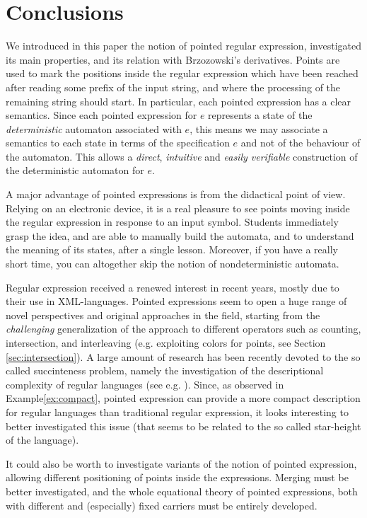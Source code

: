 \documentclass[preprint]{sigplanconf}
\begin{document}
\section{Conclusions}
We introduced in this paper the notion of pointed regular
expression, investigated its main properties, and its 
relation with Brzozowski's derivatives. 
Points are used to mark the positions inside the regular
expression which have been reached after reading some prefix of
the input string, and where the processing
of the remaining string should start. In particular,
each pointed expression has a clear semantics. Since
each pointed expression for $e$ represents a state of 
the {\em deterministic} automaton associated
with $e$, this means we may associate a semantics to each
state in terms of the specification $e$ 
and not of the behaviour of the automaton. 
This allows a {\em direct}, {\em intuitive} and 
{\em easily verifiable} construction of the deterministic 
automaton for $e$. 

A major advantage of pointed expressions 
is from the didactical point of view. Relying on 
an electronic device, it is a real pleasure to see
points moving inside the regular expression in response to
an input symbol. Students immediately grasp the idea, and 
are able to manually build the automata, and to understand the
meaning of its states, after a single lesson. Moreover, if you 
have a really short time, you can altogether skip the notion of 
nondeterministic automata.

Regular expression received a renewed interest in recent 
years, mostly due to their use in XML-languages. 
Pointed expressions seem to open a huge range of novel 
perspectives and original approaches in the field, starting
from the {\em challenging} generalization of the approach to
different operators such as counting, intersection, 
and interleaving (e.g. exploiting colors for points, 
see Section \ref{sec:intersection}). A large amount
of research has been recently devoted to the so called
succinteness problem, namely the investigation
of the descriptional complexity of regular languages
(see e.g. \cite{Gelade10, GruberH08, HolzerK09}). Since,
as observed in Example\ref{ex:compact}, pointed expression
can provide a more compact description for regular languages
than traditional regular expression, it looks interesting to better 
investigated this issue (that seems to be related to the so called
star-height \cite{eggan63} of the language).




It could also be worth to investigate variants of the
notion of pointed expression, allowing different
positioning of points inside the expressions. 
Merging must be better investigated, and the whole equational
theory of pointed expressions, both with different and
(especially) fixed carriers must be entirely developed.
\end{document}

